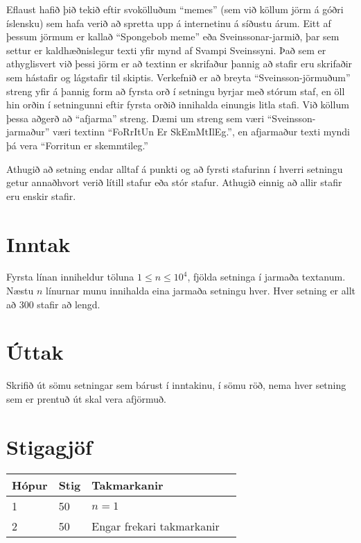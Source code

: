 Eflaust hafið þið tekið eftir svokölluðum ``memes'' (sem við köllum jörm á góðri íslensku) sem hafa verið að spretta upp á internetinu á síðustu árum.
Eitt af þessum jörmum er kallað ``Spongebob meme'' eða Sveinssonar-jarmið, þar sem settur er kaldhæðnislegur texti yfir mynd af Svampi Sveinssyni.
Það sem er athyglisvert við þessi jörm er að textinn er skrifaður þannig að stafir eru skrifaðir sem hástafir og lágstafir til skiptis.
Verkefnið er að breyta ``Sveinsson-jörmuðum'' streng yfir á þannig form að fyrsta orð í setningu byrjar með stórum staf, en öll hin orðin í setningunni eftir fyrsta orðið innihalda einungis litla stafi.
Við köllum þessa aðgerð að ``afjarma'' streng.
Dæmi um streng sem væri ``Sveinsson-jarmaður'' væri textinn ``FoRrItUn Er SkEmMtIlEg.'', en afjarmaður texti myndi þá vera ``Forritun er skemmtileg.''

Athugið að setning endar alltaf á punkti og að fyrsti stafurinn í hverri setningu getur annaðhvort verið lítill stafur eða stór stafur.
Athugið einnig að allir stafir eru enskir stafir.

\section*{Inntak}
Fyrsta línan inniheldur töluna $1 \leq n \leq 10^4$, fjölda setninga í jarmaða textanum.
Næstu $n$ línurnar munu innihalda eina jarmaða setningu hver.
Hver setning er allt að $300$ stafir að lengd.

\section*{Úttak}
Skrifið út sömu setningar sem bárust í inntakinu, í sömu röð, nema hver setning sem er prentuð út skal vera afjörmuð.

\section*{Stigagjöf}
\begin{tabular}{|l|l|l|l|}
\hline
Hópur & Stig & Takmarkanir \\ \hline
1     & 50   & $n = 1$\\ \hline
2     & 50   & Engar frekari takmarkanir\\ \hline
\end{tabular}
